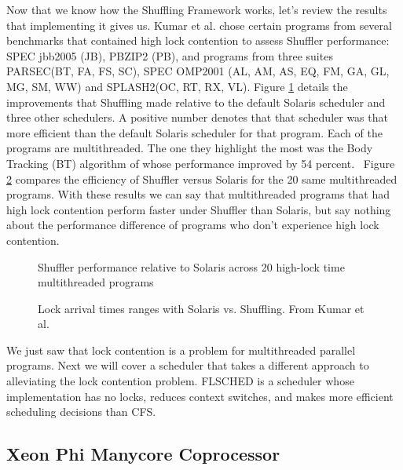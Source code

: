 \documentclass{sig-alternate}
\begin{document}
Now that we know how the Shuffling Framework works, let's review the results that implementing it gives us. Kumar et al. chose certain programs from several benchmarks that contained high lock contention to assess Shuffler performance: SPEC jbb2005 (JB), PBZIP2 (PB), and programs from three suites PARSEC(BT, FA, FS, SC), SPEC OMP2001 (AL, AM, AS, EQ, FM, GA, GL, MG, SM, WW) and SPLASH2(OC, RT, RX, VL). Figure \ref{fig:shuf_performance} details the improvements that Shuffling made relative to the default Solaris scheduler and three other schedulers. A positive number denotes that that scheduler was that more efficient than the default Solaris scheduler for that program. Each of the programs are multithreaded. The one they highlight the most was the Body Tracking (BT) algorithm of whose performance improved by 54 percent.~\cite{Kumar:2014} Figure \ref{fig:shuf_vs_solaris} compares the efficiency of Shuffler versus Solaris for the 20 same multithreaded programs. With these results we can say that multithreaded programs that had high lock contention perform faster under Shuffler than Solaris, but say nothing about the performance difference of programs who don't experience high lock contention.
\begin{figure}
\centering
{}
\caption{Shuffler performance relative to Solaris across 20 high-lock time multithreaded programs~\cite{Kumar:2014}}
\label{fig:shuf_performance}
\end{figure}

\begin{figure}
\centering
{}
\caption{Lock arrival times ranges with Solaris vs. Shuffling. From Kumar et al.~\cite{Kumar:2014}}
\label{fig:shuf_vs_solaris}
\end{figure}

We just saw that lock contention is a problem for multithreaded parallel programs. Next we will cover a scheduler that takes a different approach to alleviating the lock contention problem. FLSCHED is a scheduler whose implementation has no locks, reduces context switches, and makes more efficient scheduling decisions than CFS.~\cite{Jo:2017}

\subsection{Xeon Phi Manycore Coprocessor}
\label{sec:flsched}
\end{document}
